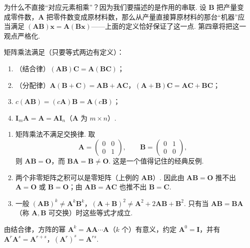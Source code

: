 \documentclass[lang=cn,10.5pt,scheme=chinese,toc=twocol,section,chinesefont=nofont,
twoside,citestyle=gb7714-2015,bibstyle=gb7714-2015]{elegantbook}
\DeclareRobustCommand{\textbf}[1]{{\lnsemiboldlatin\lnsemiboldcjk #1}}
\newcommand{\vv}[1]{\boldsymbol{#1}}
\numberwithin{equation}{section}   %
\begin{document}
\begin{motivebox}
  为什么不直接“对应元素相乘”？因为我们要描述的是\textbf{作用的串联}. 设 $\vv B$ 把产量变成零件数，$\vv A$ 把零件数变成原材料数，那么从产量直接算原材料的那台“机器”应当满足 $(\vv{AB})\vv x=\vv A(\vv B\vv x)$——上面的定义恰好保证了这一点. 第四章将把这一观点严格化.
\end{motivebox}

矩阵乘法满足（只要等式两边有定义）：
\begin{enumerate}
  \item （结合律）$(\vv{AB})\vv{C}=\vv{A}(\vv{BC})$；
  \item （分配律）$\vv{A}(\vv{B}+\vv{C})=\vv{AB}+\vv{AC}$，$(\vv{A}+\vv{B})\vv{C}=\vv{AC}+\vv{BC}$；
  \item $c(\vv{AB})=(c\vv A)\vv B=\vv A(c\vv B)$；
  \item $\vv{I}_m \vv{A} = \vv{A} = \vv{A}\vv{I}_n$（$\vv A$ 为 $m\times n$）.
\end{enumerate}

\begin{pitfallbox}
  \begin{enumerate}
    \item \textbf{矩阵乘法不满足交换律.} 取
          \[
            \vv{A}=
            \begin{pmatrix}
              0 & 0 \\ 0 & 1
            \end{pmatrix}
            ,\qquad \vv{B}=
            \begin{pmatrix}
              0 & 1 \\ 0 & 0
            \end{pmatrix}
            ,
          \]
          则 $\vv{AB}=\vv O$，而 $\vv{BA}=\vv B\ne\vv O$. 这是一个值得记住的经典反例.
    \item \textbf{两个非零矩阵之积可以是零矩阵}（上例的 $\vv{AB}$）. 因此由 $\vv{AB}=\vv O$ 推不出 $\vv A=\vv O$ 或 $\vv B=\vv O$；由 $\vv{AB}=\vv{AC}$ 也推不出 $\vv B=\vv C$.
    \item 一般 $(\vv{AB})^k\ne\vv A^k\vv B^k$，$(\vv A+\vv B)^2\neq\vv A^2+2\vv{AB}+\vv B^2$. 只有当 $\vv{AB}=\vv{BA}$（称 $\vv A,\vv B$ \textbf{可交换}）时这些等式才成立.
  \end{enumerate}
\end{pitfallbox}

由结合律，方阵的幂 $\vv A^k=\vv A\vv A\cdots\vv A$（$k$ 个）有意义，约定 $\vv A^0=\vv I$，并有 $\vv{A}^r\vv{A}^s=\vv{A}^{r+s}$，$(\vv{A}^r)^s=\vv{A}^{rs}$.
\end{document}
